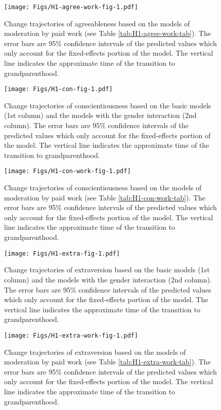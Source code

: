 \documentclass[
  english,
  man, noextraspace]{apa7}
\begin{document}
\begin{figure}
\centering
\texttt{[image: Figs/H1-agree-work-fig-1.pdf]}
\caption{\label{fig:H1-agree-work-fig}Change trajectories of agreeableness based on the models of moderation by paid work (see Table \ref{tab:H1-agree-work-tab}). The error bars are 95\% confidence intervals of the predicted values which only account for the fixed-effects portion of the model. The vertical line indicates the approximate time of the transition to grandparenthood.}
\end{figure}



\begin{figure}
\centering
\texttt{[image: Figs/H1-con-fig-1.pdf]}
\caption{\label{fig:H1-con-fig}Change trajectories of conscientiousness based on the basic models (1st column) and the models with the gender interaction (2nd column). The error bars are 95\% confidence intervals of the predicted values which only account for the fixed-effects portion of the model. The vertical line indicates the approximate time of the transition to grandparenthood.}
\end{figure}



\begin{figure}
\centering
\texttt{[image: Figs/H1-con-work-fig-1.pdf]}
\caption{\label{fig:H1-con-work-fig}Change trajectories of conscientiousness based on the models of moderation by paid work (see Table \ref{tab:H1-con-work-tab}). The error bars are 95\% confidence intervals of the predicted values which only account for the fixed-effects portion of the model. The vertical line indicates the approximate time of the transition to grandparenthood.}
\end{figure}



\begin{figure}
\centering
\texttt{[image: Figs/H1-extra-fig-1.pdf]}
\caption{\label{fig:H1-extra-fig}Change trajectories of extraversion based on the basic models (1st column) and the models with the gender interaction (2nd column). The error bars are 95\% confidence intervals of the predicted values which only account for the fixed-effects portion of the model. The vertical line indicates the approximate time of the transition to grandparenthood.}
\end{figure}



\begin{figure}
\centering
\texttt{[image: Figs/H1-extra-work-fig-1.pdf]}
\caption{\label{fig:H1-extra-work-fig}Change trajectories of extraversion based on the models of moderation by paid work (see Table \ref{tab:H1-extra-work-tab}). The error bars are 95\% confidence intervals of the predicted values which only account for the fixed-effects portion of the model. The vertical line indicates the approximate time of the transition to grandparenthood.}
\end{figure}
\end{document}
